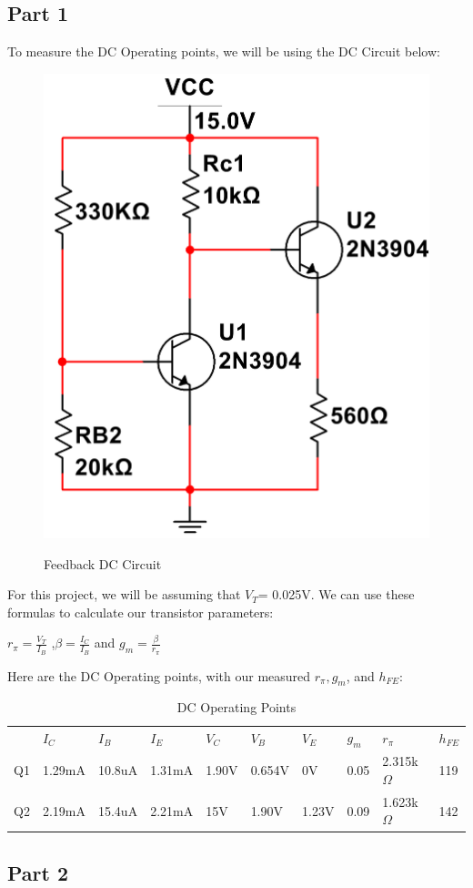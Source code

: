\documentclass[12pt]{article}
\begin{document}
\subsection{Part 1}
To measure the DC Operating points, we will be using the DC Circuit below:
\begin{figure}[h!]
    \centering
    \includegraphics[height=0.25\textwidth]{Images/partCDC.png}\\
    \caption{Feedback DC Circuit}
    \label{fig:feedbacdccircuit}
\end{figure}
\FloatBarrier
For this project, we will be assuming that $V_T$= 0.025V. We can use these formulas to 
calculate our transistor parameters:
\begin{center}
    $r_\pi= \frac{V_T}{I_B}$ ,$\beta = \frac{I_C}{I_B}$ and $g_m = \frac{\beta}{r_\pi}$
\end{center}
Here are the DC Operating points, with our measured $r_\pi,g_m$, and $h_{FE}$:
\FloatBarrier
\begin{table}[h!]
    \centering
    \begin{tabular}{l|lllllllll}
     & $I_C$ & $I_B$ & $I_E$ & $V_C$ & $V_B$ & $V_E$ & $g_m$ & $r_\pi$ & $h_{FE}$ \\ \cline{1-10}
    Q1 & 1.29mA & 10.8uA & 1.31mA & 1.90V & 0.654V & 0V & 0.05 & 2.315k$\Omega$ & 119  \\ \cline{1-10}
    Q2 & 2.19mA & 15.4uA & 2.21mA & 15V & 1.90V & 1.23V & 0.09 & 1.623k$\Omega$ & 142
    \end{tabular}%
    \caption{DC Operating Points}
    \label{DC Operating Points}
\end{table}

\subsection{Part 2}
\end{document}
